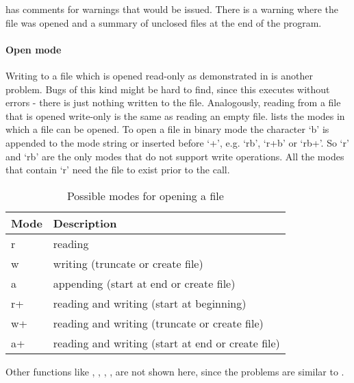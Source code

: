  has comments for warnings that would be issued. There is a warning where the file was opened and a summary of unclosed files at the end of the program.

\paragraph*{Open mode}
Writing to a file which is opened read-only as demonstrated in  is another problem. Bugs of this kind might be hard to find, since this executes without errors - there is just nothing written to the file.
Analogously, reading from a file that is opened write-only is the same as reading an empty file.
 lists the modes in which a file can be opened.
To open a file in binary mode the character `b' is appended to the mode string or inserted before `+', e.g. `rb', `r+b' or `rb+'.
So `r' and `rb' are the only modes that do not support write operations.
All the modes that contain `r' need the file to exist prior to the call.
\begin{table}[ht]
\centering
\begin{tabular}{ll}\hline
Mode & Description\\\hline
r  & reading\\
w  & writing (truncate or create file)\\
a  & appending (start at end or create file)\\
r+ & reading and writing (start at beginning)\\
w+ & reading and writing (truncate or create file)\\
a+ & reading and writing (start at end or create file)
\end{tabular}
\caption{Possible modes for opening a file \cite{ISO:2011:IIIb}}
\label{tbl:open_modes}
\end{table}

Other functions like , , , ,  are not shown here, since the problems are similar to .


